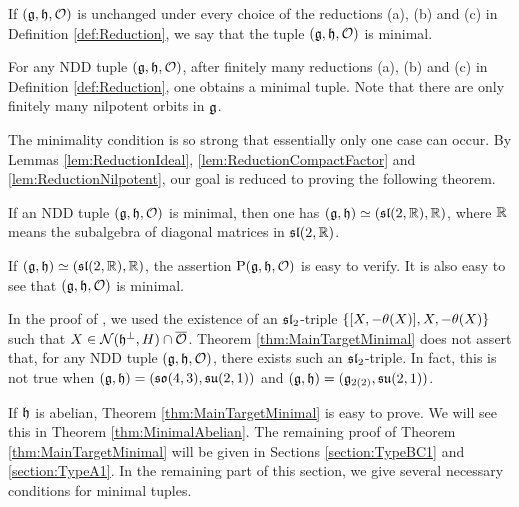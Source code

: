 \begin{definition} \label{def:minimal}
	If $(\mathfrak{g}, \mathfrak{h}, \mathcal{O})$ is unchanged under every choice of the reductions (a), (b) and (c) in Definition \ref{def:Reduction}, we say that the tuple $(\mathfrak{g}, \mathfrak{h}, \mathcal{O})$ is minimal.
\end{definition}

For any NDD tuple $(\mathfrak{g}, \mathfrak{h}, \mathcal{O})$, after finitely many reductions (a), (b) and (c) in Definition \ref{def:Reduction}, one obtains a minimal tuple.
Note that there are only finitely many nilpotent orbits in $\mathfrak{g}$.

The minimality condition is so strong that essentially only one case can occur.
By Lemmas \ref{lem:ReductionIdeal}, \ref{lem:ReductionCompactFactor} and \ref{lem:ReductionNilpotent}, our goal is reduced to proving the following theorem.

\begin{theorem} \label{thm:MainTargetMinimal}
	If an NDD tuple $(\mathfrak{g}, \mathfrak{h}, \mathcal{O})$ is minimal, then one has $(\mathfrak{g}, \mathfrak{h}) \simeq (\mathfrak{sl}(2,\mathbb{R}), \mathbb{R})$, where $\mathbb{R}$ means the subalgebra of diagonal matrices in $\mathfrak{sl}(2,\mathbb{R})$.
\end{theorem}

\begin{remark}
	If $(\mathfrak{g}, \mathfrak{h}) \simeq (\mathfrak{sl}(2,\mathbb{R}), \mathbb{R})$, the assertion $\mathrm{P}(\mathfrak{g}, \mathfrak{h}, \mathcal{O})$ is easy to verify.
	It is also easy to see that $(\mathfrak{g}, \mathfrak{h}, \mathcal{O})$ is minimal.
\end{remark}

\begin{remark}
	In the proof of \cite[Theorem 21]{Ki24}, we used the existence of an $\mathfrak{sl}_2$-triple $\left\{[X, -\theta(X)], X, -\theta(X) \right\}$ such that $X \in \mathcal{N}(\mathfrak{h}^\perp, H) \cap \overline{\mathcal{O}}$.
	Theorem \ref{thm:MainTargetMinimal} does not assert that, for any NDD tuple $(\mathfrak{g}, \mathfrak{h}, \mathcal{O})$, there exists such an $\mathfrak{sl}_2$-triple.
	In fact, this is not true when $(\mathfrak{g}, \mathfrak{h}) = (\mathfrak{so}(4, 3), \mathfrak{su}(2, 1))$ and $(\mathfrak{g}, \mathfrak{h}) = (\mathfrak{g}_{2(2)}, \mathfrak{su}(2, 1))$.
\end{remark}

If $\mathfrak{h}$ is abelian, Theorem \ref{thm:MainTargetMinimal} is easy to prove.
We will see this in Theorem \ref{thm:MinimalAbelian}.
The remaining proof of Theorem \ref{thm:MainTargetMinimal} will be given in Sections \ref{section:TypeBC1} and \ref{section:TypeA1}.
In the remaining part of this section, we give several necessary conditions for minimal tuples.

